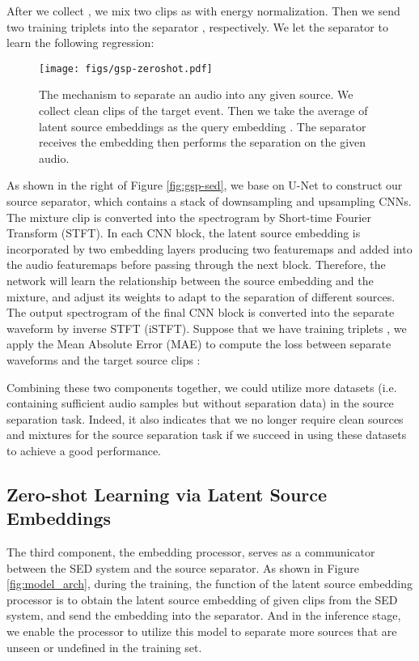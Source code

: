 \documentclass[letterpaper]{article} \usepackage{aaai22}  \usepackage{times}  \usepackage{helvet}  \usepackage{courier}  \usepackage[hyphens]{url}  \usepackage{graphicx} \urlstyle{rm} \def\UrlFont{\rm}  \usepackage{natbib}  \usepackage{caption} \DeclareCaptionStyle{ruled}{labelfont=normalfont,labelsep=colon,strut=off} \frenchspacing  \setlength{\pdfpagewidth}{8.5in}  \setlength{\pdfpageheight}{11in}  \usepackage{algorithm}
\begin{document}
After we collect , we mix two clips as  with energy normalization. Then we send two training triplets  into the separator , respectively. We let the separator to learn the following regression:


\begin{figure}[t]
    \centering
    \texttt{[image: figs/gsp-zeroshot.pdf]}
    \caption{The mechanism to separate an audio into any given source. We collect  clean clips of the target event. Then we take the average of latent source embeddings as the query embedding . The separator receives the embedding then performs the separation on the given audio. }
    \label{fig:model_zero}
    \vspace{-0.5cm}
\end{figure}

As shown in the right of Figure \ref{fig:gsp-sed}, we base on U-Net \cite{unet} to construct our source separator, which contains a stack of downsampling and upsampling CNNs. The mixture clip  is converted into the spectrogram by Short-time Fourier Transform (STFT). In each CNN block, the latent source embedding  is incorporated by two embedding layers producing two featuremaps and added into the audio featuremaps before passing through the next block. Therefore, the network will learn the relationship between the source embedding and the mixture, and adjust its weights to adapt to the separation of different sources. The output spectrogram of the final CNN block is converted into the separate waveform  by inverse STFT (iSTFT). Suppose that we have  training triplets , we apply the Mean Absolute Error (MAE) to compute the loss between separate waveforms  and the target source clips :


Combining these two components together, we could utilize more datasets (i.e. containing sufficient audio samples but without separation data) in the source separation task. Indeed, it also indicates that we no longer require clean sources and mixtures for the source separation task \cite{qiangss, qiangse} if we succeed in using these datasets to achieve a good performance.


\subsection{Zero-shot Learning via Latent Source Embeddings}
The third component, the embedding processor, serves as a communicator between the SED system and the source separator. As shown in Figure \ref{fig:model_arch}, during the training, the function of the latent source embedding processor is to obtain the latent source embedding  of given clips  from the SED system, and send the embedding into the separator. And in the inference stage, we enable the processor to utilize this model to separate more sources that are unseen or undefined in the training set.
\end{document}
